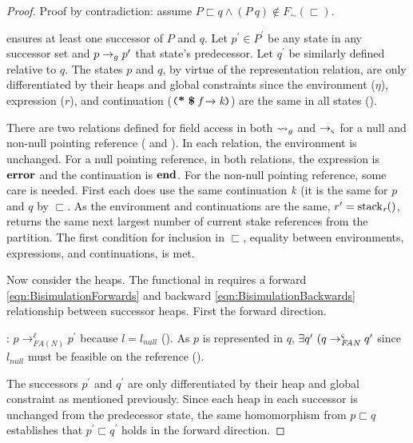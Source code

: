 \begin{proof}
Proof by contradiction: assume $P \sqsubset q \wedge (P\ q) \not\in F_\sim(\sqsubset)$.

 ensures at least one successor of $P$ and $q$. Let $p^\prime \in P^\prime$ be any
state in any successor set and $p \rightarrow_{g} p^\prime$ that state's
predecessor. Let $q^\prime$ be similarly defined relative to $q$.  The states $p$ and $q$, by virtue of the
representation relation, are only differentiated by their heaps and
global constraints since the environment ($\eta$), expression ($r$),
and continuation ($\lp \cfgt{*}\ \cfgt{\$}\ \cfgnt{f} \rightarrow
\cfgnt{k}\rp$) are the same in all states 
(). 

There are two relations defined for field access in both $\leadsto_{g}$ and
$\rightarrow_{\varsigma}$ for a null and non-null pointing reference (
and ). In each relation, the environment is
unchanged. For a null pointing reference, in both relations, the
expression is $\textbf{error}$ and the continuation is $\textbf{end}$. For
the non-null pointing reference, some care is needed. First each does
use the same continuation $\emph{k}$ (it is the same for $p$ and $q$
by $\sqsubset$. As the environment and continuations are the same,
$r^\prime = \mathrm{stack}_{\emph{r}}()$, returns the same next largest
number of current stake references from the partition. The first
condition for inclusion in $\sqsubset$, equality between environments,
expressions, and continuations, is met.

Now consider the heaps.  The functional in  requires a forward
\eqref{eqn:BisimulationForwards} and backward
\eqref{eqn:BisimulationBackwards} relationship between successor
heaps. First the forward direction.

: $p \rightarrow^\ell_\mathit{FA(N)}
p^\prime$ because $l = l_\mathit{null}$ (). As $p$
is represented in $q$, $\exists q^\prime\ (q
\rightarrow^{\varsigma}_\mathit{FA{N}} q^\prime$ since $l_{\mathit{null}}$
must be feasible on the reference (). 

The successors $p^\prime$ and $q^\prime$ are only differentiated by
their heap and global constraint as mentioned previously. Since each heap in each successor is unchanged
from the predecessor state, the same homomorphism from $p \sqsubset q$
establishes that $p^\prime \sqsubset q^\prime$ holds in the forward direction.


\end{proof}
